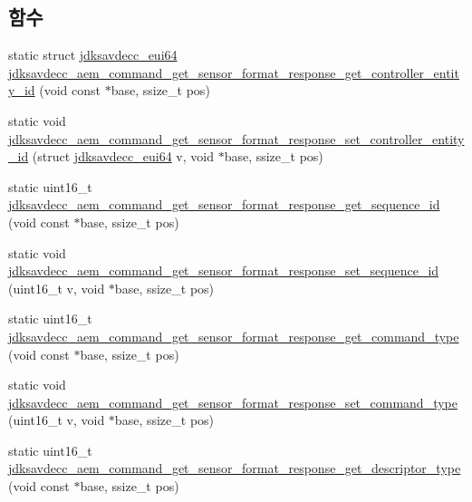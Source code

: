 \subsection*{함수}
\begin{DoxyCompactItemize}
\item 
static struct \hyperlink{structjdksavdecc__eui64}{jdksavdecc\+\_\+eui64} \hyperlink{group__command__get__sensor__format__response_ga3ed331fde090333a25eead3dcc5d62ad}{jdksavdecc\+\_\+aem\+\_\+command\+\_\+get\+\_\+sensor\+\_\+format\+\_\+response\+\_\+get\+\_\+controller\+\_\+entity\+\_\+id} (void const $\ast$base, ssize\+\_\+t pos)
\item 
static void \hyperlink{group__command__get__sensor__format__response_ga3a0565dcce597fca3369751a23ef46cb}{jdksavdecc\+\_\+aem\+\_\+command\+\_\+get\+\_\+sensor\+\_\+format\+\_\+response\+\_\+set\+\_\+controller\+\_\+entity\+\_\+id} (struct \hyperlink{structjdksavdecc__eui64}{jdksavdecc\+\_\+eui64} v, void $\ast$base, ssize\+\_\+t pos)
\item 
static uint16\+\_\+t \hyperlink{group__command__get__sensor__format__response_ga1ab4329a0b4dab3871b19a95469c88f7}{jdksavdecc\+\_\+aem\+\_\+command\+\_\+get\+\_\+sensor\+\_\+format\+\_\+response\+\_\+get\+\_\+sequence\+\_\+id} (void const $\ast$base, ssize\+\_\+t pos)
\item 
static void \hyperlink{group__command__get__sensor__format__response_gaa4457117b76b3cd2d9ad9391efa3dc7d}{jdksavdecc\+\_\+aem\+\_\+command\+\_\+get\+\_\+sensor\+\_\+format\+\_\+response\+\_\+set\+\_\+sequence\+\_\+id} (uint16\+\_\+t v, void $\ast$base, ssize\+\_\+t pos)
\item 
static uint16\+\_\+t \hyperlink{group__command__get__sensor__format__response_ga52a2704e6034325084e190ce51703280}{jdksavdecc\+\_\+aem\+\_\+command\+\_\+get\+\_\+sensor\+\_\+format\+\_\+response\+\_\+get\+\_\+command\+\_\+type} (void const $\ast$base, ssize\+\_\+t pos)
\item 
static void \hyperlink{group__command__get__sensor__format__response_gad8a80c3e4282b7639245d95d02e13ff4}{jdksavdecc\+\_\+aem\+\_\+command\+\_\+get\+\_\+sensor\+\_\+format\+\_\+response\+\_\+set\+\_\+command\+\_\+type} (uint16\+\_\+t v, void $\ast$base, ssize\+\_\+t pos)
\item 
static uint16\+\_\+t \hyperlink{group__command__get__sensor__format__response_ga95629c7b418d2af5b65d61d23dbe6300}{jdksavdecc\+\_\+aem\+\_\+command\+\_\+get\+\_\+sensor\+\_\+format\+\_\+response\+\_\+get\+\_\+descriptor\+\_\+type} (void const $\ast$base, ssize\+\_\+t pos)
\item 

\end{DoxyCompactItemize}
